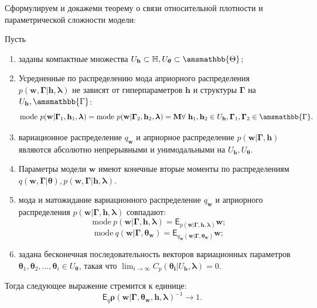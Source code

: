 Сформулируем и докажеми теорему о связи относительной плотности и параметрической сложности модели:

\begin{theorem}
Пусть
\begin{enumerate}
\item заданы компактные множества $U_\mathbf{h} \subset \mathbb{H}, U_{\boldsymbol{\theta}} \subset \amsmathbb{\Theta}$;


\item Усредненные по распределению мода априорного распределения $p(\mathbf{w},\boldsymbol{\Gamma}| \mathbf{h}, \boldsymbol{\lambda})$ не зависят от гиперпараметров $\mathbf{h}$ и структуры $\boldsymbol{\Gamma}$ на $U_\mathbf{h}, \amsmathbb{\Gamma}$:
\[\text{mode}~p(\mathbf{w}|\boldsymbol{\Gamma}_1, \mathbf{h}_1, \boldsymbol{\lambda})=\text{mode}~ p(\mathbf{w}|\boldsymbol{\Gamma}_2,\mathbf{h}_2, \boldsymbol{\lambda})=\mathbf{M} \forall~\mathbf{h}_1, \mathbf{h}_2\in U_\mathbf{h},\boldsymbol{\Gamma}_1, \boldsymbol{\Gamma}_2\in \amsmathbb{\Gamma}.
\]

\item вариационное распределение $q_\mathbf{w}$ и априорное распределение $p(\mathbf{w}|\boldsymbol{\Gamma}, \mathbf{h})$  являются абсолютно непрерывными и унимодальными на  $U_\mathbf{h}, U_{\boldsymbol{\theta}}$.

\item Параметры модели $\mathbf{w}$ имеют конечные вторые моменты по распределениям $q(\mathbf{w}, \boldsymbol{\Gamma}|\boldsymbol{\theta}), p(\mathbf{w}, \boldsymbol{\Gamma}|\mathbf{h}, \boldsymbol{\lambda})$.

\item мода и матожидание вариационного распределение $q_\mathbf{w}$ и априорного распределения $p(\mathbf{w}|\boldsymbol{\Gamma},\mathbf{h}, \boldsymbol{\lambda})$  совпадают:
\[
    \text{mode}~p(\mathbf{w}|\boldsymbol{\Gamma},\mathbf{h}, \boldsymbol{\lambda}) = \mathsf{E}_{p(\mathbf{w}| \boldsymbol{\Gamma}, \mathbf{h}, \boldsymbol{\lambda})} \mathbf{w};
\]
\[
  \text{mode}~q(\mathbf{w}|\boldsymbol{\Gamma}, \boldsymbol{\theta}_\mathbf{w}) = \mathsf{E}_{q_\mathbf{w}(\mathbf{w}|\boldsymbol{\Gamma},  \boldsymbol{\theta}_\mathbf{w})} \mathbf{w};
\]

\item задана  бесконечная последовательность векторов вариационных параметров $\boldsymbol{\theta}_1,\boldsymbol{\theta}_2,\dots, \boldsymbol{\theta}_i \in U_{\boldsymbol{\theta}}$, такая что $\lim_{i \to \infty}C_p(\boldsymbol{\theta_i}|U_{\mathbf{h}}, \boldsymbol{\lambda}) = 0.$ 

\end{enumerate}
Тогда следующее выражение стремится к единице:
\[
   \mathsf{E}_q \boldsymbol{\rho}(\mathbf{w}|\boldsymbol{\Gamma}, \boldsymbol{\theta}_\mathbf{w}, \mathbf{h},\boldsymbol{\lambda})^{-1} \to 1.
\]


\end{theorem}

